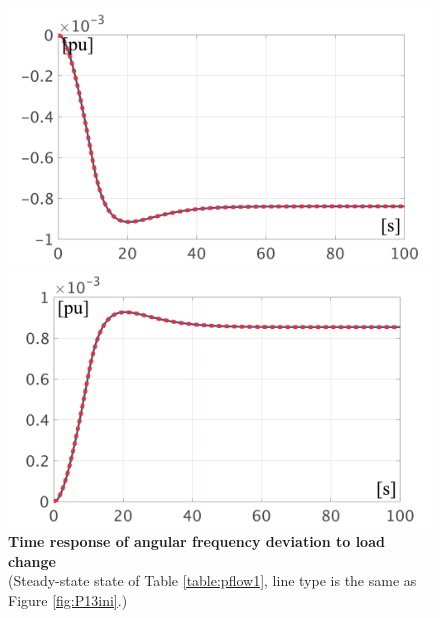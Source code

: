\documentclass[graybox, envcountchap]{svmult}
\begin{document}
\begin{figure}[t]
  \centering
  {
  \begin{minipage}{0.49\linewidth}
    \centering
    \includegraphics[width = 1.0\linewidth]{figs/P1mi}
  \end{minipage}
  \begin{minipage}{0.49\linewidth}
    \centering
    \includegraphics[width = 1.0\linewidth]{figs/P1pl}
  \end{minipage}
  \medskip
  \caption{\textbf{Time response of angular frequency deviation to load change}
  \\ \centering(Steady-state state of Table \ref{table:pflow1}, line type is
  the same as Figure \ref{fig:P13ini}.)}
  \label{fig:P1load}
  }
\medskip
\end{figure}
\end{document}
